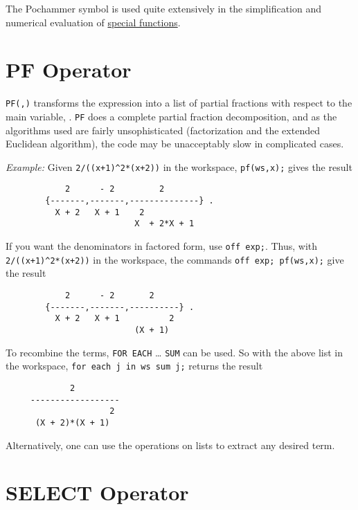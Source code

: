 The Pochammer symbol is used quite extensively in the simplification and
numerical evaluation of \hyperlink{SPECFNS}{special functions}.

\section{PF Operator}
\hypertarget{operator:PF}{}

\texttt{PF(,)} transforms the expression  into
a list of partial fractions with respect to the main variable, .
\texttt{PF}
does a complete partial fraction decomposition, and as the algorithms used
are fairly unsophisticated (factorization and the extended Euclidean
algorithm), the code may be unacceptably slow in complicated cases.

\textit{Example:}
Given \texttt{2/((x+1)\textasciicircum2*(x+2))} in the workspace,
\texttt{pf(ws,x);} gives the result
\begin{samepage}
\begin{verbatim}
            2      - 2         2
        {-------,-------,--------------} .
          X + 2   X + 1    2
                          X  + 2*X + 1
\end{verbatim}
\end{samepage}

If you want the denominators in factored form, use \texttt{off exp;}.
Thus, with \texttt{2/((x+1)\textasciicircum2*(x+2))} in the workspace,
the commands \texttt{off exp; pf(ws,x);} give the result
\begin{verbatim}
            2      - 2       2
        {-------,-------,----------} .
          X + 2   X + 1          2
                          (X + 1)
\end{verbatim}

To recombine the terms, \texttt{FOR EACH} \ldots{} \texttt{SUM} can be used.  
So with the above list in the workspace, 
\texttt{for each j in ws sum j;} returns the result
\begin{verbatim}
             2
     ------------------
                     2
      (X + 2)*(X + 1)
\end{verbatim}

Alternatively, one can use the operations on lists to extract any desired
term.


\section{SELECT Operator}
\hypertarget{operator:SELECT}{}

